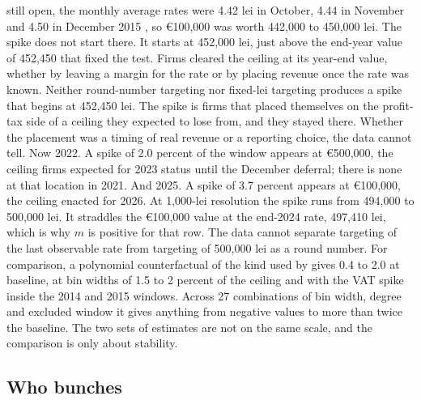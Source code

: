 \documentclass[12pt]{article}
\begin{document}
still open, the monthly average rates were 4.42 lei in October, 4.44 in November and 4.50 in December 2015 \citep{bnr2015}, so \euro{}100,000 was worth 442,000 to 450,000 lei. The spike does not start there. It starts at 452,000 lei, just above the end-year value of 452,450 that fixed the test. Firms cleared the ceiling at its year-end value, whether by leaving a margin for the rate or by placing revenue once the rate was known. Neither round-number targeting nor fixed-lei targeting produces a spike that begins at 452,450 lei. The spike is firms that placed themselves on the profit-tax side of a ceiling they expected to lose from, and they stayed there. Whether the placement was a timing of real revenue or a reporting choice, the data cannot tell. Now 2022. A spike of 2.0 percent of the window appears at \euro{}500,000, the ceiling firms expected for 2023 status until the December deferral; there is none at that location in 2021. And 2025. A spike of 3.7 percent appears at \euro{}100,000, the ceiling enacted for 2026. At 1,000-lei resolution the spike runs from 494,000 to 500,000 lei. It straddles the \euro{}100,000 value at the end-2024 rate, 497,410 lei, which is why $m$ is positive for that row. The data cannot separate targeting of the last observable rate from targeting of 500,000 lei as a round number. For comparison, a polynomial counterfactual of the kind used by \citet{chetty2011} gives 0.4 to 2.0 at baseline, at bin widths of 1.5 to 2 percent of the ceiling and with the VAT spike inside the 2014 and 2015 windows. Across 27 combinations of bin width, degree and excluded window it gives anything from negative values to more than twice the baseline. The two sets of estimates are not on the same scale, and the comparison is only about stability.

\FloatBarrier
\subsection{Who bunches}
\end{document}
